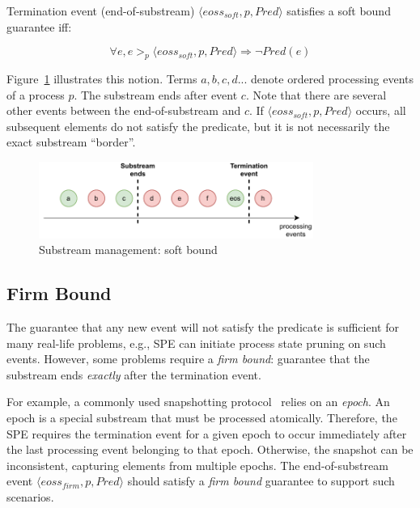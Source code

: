\begin{definition}
Termination event (end-of-substream) $\langle eoss_{soft}, p, Pred\rangle$ satisfies a soft bound guarantee iff:

\begin{equation}
\forall e, e >_p \langle eoss_{soft}, p, Pred\rangle \Rightarrow \neg Pred(e)
\end{equation}
\end{definition}

Figure~\ref{general_guarantees} illustrates this notion. Terms $a,b,c,d...$ denote ordered processing events of a process $p$. The substream ends after event $c$. Note that there are several other events between the end-of-substream and $c$. If $\langle eoss_{soft}, p, Pred\rangle$ occurs, all subsequent elements do not satisfy the predicate, but it is not necessarily the exact substream ``border''.

\begin{figure}[t]
  \centering
  \includegraphics[width=0.80\textwidth]{Chapters/SubstreamConsistency/pics/general-guarantee.pdf}
  \caption{Substream management: soft bound}
  \label{general_guarantees}
\end{figure}

\subsection{Firm Bound}

The guarantee that any new event will not satisfy the predicate is sufficient for many real-life problems, e.g., SPE can initiate process state pruning on such events. However, some problems require a {\em firm bound}: guarantee that the substream ends {\em exactly} after the termination event. 

For example, a commonly used snapshotting protocol~\cite{2015arXiv150608603C, jacques2016consistent} relies on an {\em epoch}. An epoch is a special substream that must be processed atomically. Therefore, the SPE requires the termination event for a given epoch to occur immediately after the last processing event belonging to that epoch. Otherwise, the snapshot can be inconsistent, capturing elements from multiple epochs. The end-of-substream event $\langle eoss_{firm}, p, Pred\rangle$ should satisfy a {\em firm bound } guarantee to support such scenarios.

